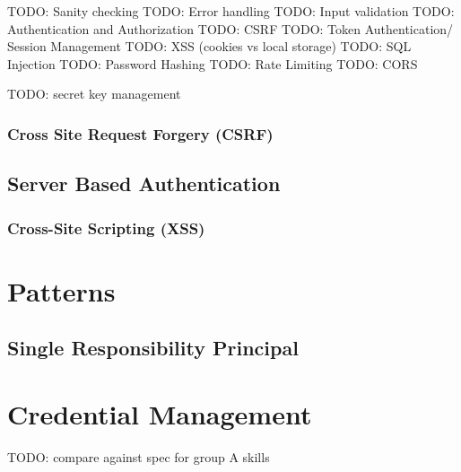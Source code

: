 TODO: Sanity checking
TODO: Error handling
TODO: Input validation
TODO: Authentication and Authorization
TODO: CSRF
TODO: Token Authentication/ Session Management
TODO: XSS (cookies vs local storage)
TODO: SQL Injection
TODO: Password Hashing
TODO: Rate Limiting
TODO: CORS

TODO: secret key management

\subsubsection{Cross Site Request Forgery (CSRF)}

\subsection{Server Based Authentication}
\subsubsection{Cross-Site Scripting (XSS)}


\section{Patterns}
\subsection{Single Responsibility Principal}


\section{Credential Management}


TODO: compare against spec for group A skills